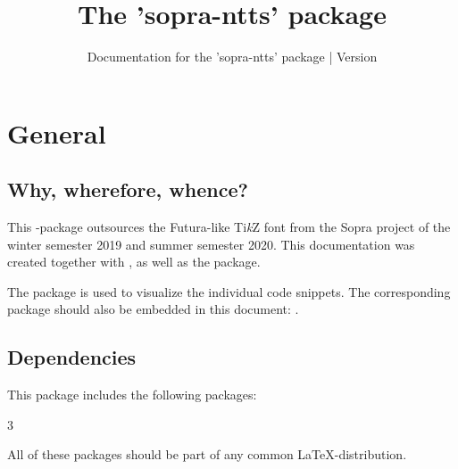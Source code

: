 \documentclass{sopra-base}
\title{The 'sopra-ntts' package}
\subtitle[Documentation for the 'sopra-ntts' package]{Documentation for the 'sopra-ntts' package | Version \thesonversion}
\begin{document}
    \maketitle

\section{General}
\subsection{Why, wherefore, whence?}
    This \LaTeXe-package outsources the Futura-like Ti\textit{k}Z font from the Sopra project of the
    winter semester 2019 and summer semester 2020.
    This documentation was created together with
    , as well as the  package.\par
    The  package is used to visualize the
    individual code snippets.
    The corresponding package should also be embedded in this document: .
\subsection{Dependencies}
    This package includes the following packages:
    \begin{multicols}{3}
    \end{multicols}
    All of these packages should be part of any common \LaTeX-distribution.
\end{document}

